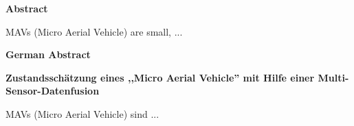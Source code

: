 \begin{center}
{\LARGE \textbf{Abstract}}
\end{center}


{\Large \textbf{\workTitel}}


MAVs (Micro Aerial Vehicle) are small, ...


\newpage
\begin{center}
{\LARGE \textbf{German Abstract}}
\end{center}



{\Large \textbf{Zustandsschätzung eines ,,Micro Aerial Vehicle'' mit Hilfe einer Multi-Sensor-Datenfusion}}


MAVs (Micro Aerial Vehicle) sind ...

